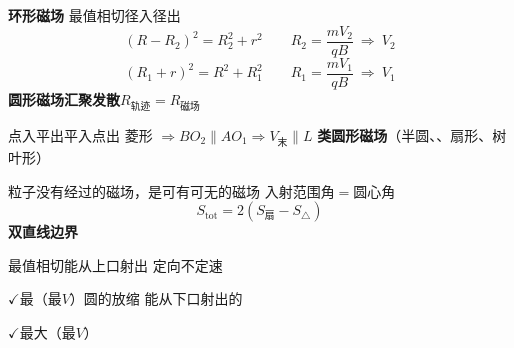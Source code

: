 \textbf{环形磁场}
最值相切\quad 径入径出
\[ (R-R_2)^2=R_2^2+r^2 \qquad R_2=\frac{mV_2}{qB}\ \Rightarrow\ V_2 \]
\[ (R_1+r)^2=R^2+R_1^2 \qquad R_1=\frac{mV_1}{qB}\ \Rightarrow\ V_1 \]
\textbf{圆形磁场汇聚发散}\quad $R_{\text{轨迹}}=R_{\text{磁场}}$

点入平出\quad 平入点出
菱形 $\Rightarrow BO_2\parallel AO_1\Rightarrow V_{\text{末}}\parallel L$
\textbf{类圆形磁场}（半圆、、扇形、树叶形）

粒子没有经过的磁场，是可有可无的磁场
入射范围角$=$圆心角
\[ S_{\mathrm{tot}}=2\left(S_{\text{扇}}-S_{\triangle}\right) \]
\textbf{双直线边界}

最值相切\quad 能从上口射出
定向不定速

$\checkmark$最（最$V$）\quad 圆的放缩
能从下口射出的

$\checkmark$最大（最$V$）
